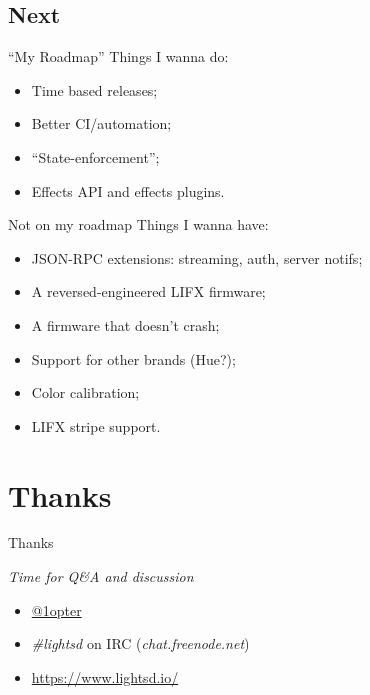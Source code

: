 \documentclass[utf8x,xcolor={usenames,svgnames}]{beamer}
\begin{document}
\subsection{Next}

\begin{frame}{``My Roadmap''}
Things I wanna do:
\vspace{1em}
\begin{itemize}
\item Time based releases;
\item Better CI/automation;
\item ``State-enforcement'';
\item Effects API and effects plugins.
\end{itemize}
\end{frame}

\begin{frame}{Not on my roadmap}
Things I wanna have:
\vspace{1em}
\begin{itemize}
\item JSON-RPC extensions: streaming, auth, server notifs;
\item A reversed-engineered LIFX firmware;
\item A firmware that doesn't crash;
\item Support for other brands (Hue?);
\item Color calibration;
\item LIFX stripe support.
\end{itemize}
\end{frame}

\section{Thanks}

{
\begin{frame}
\begin{center}\Huge{Thanks}\end{center}
\vspace{1em}
\begin{center}\Large{\emph{Time for Q\&A and discussion}}\end{center}
\vspace{1em}
\begin{itemize}
\item \Large{\href{https://twitter.com/1opter}{@1opter}}
\item \Large{\emph{\#lightsd} on IRC (\emph{chat.freenode.net})}
\item \Large{\url{https://www.lightsd.io/}}
\end{itemize}
\end{frame}}
\end{document}
